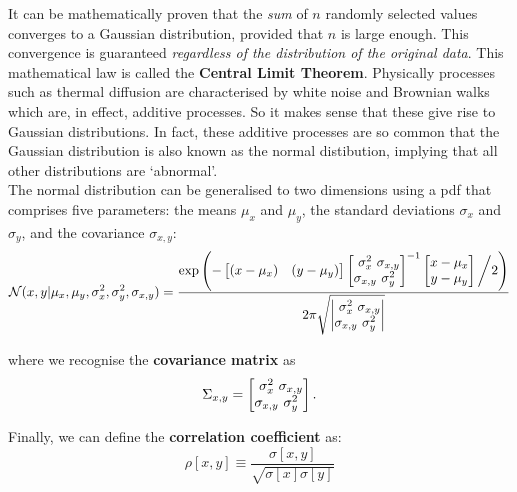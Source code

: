 \begin{refsection}
It can be mathematically proven that the \emph{sum} of $n$ randomly
selected values converges to a Gaussian distribution, provided that
$n$ is large enough. This convergence is guaranteed \textit{regardless
  of the distribution of the original data}.  This mathematical law is
called the \textbf{Central Limit Theorem}. Physically processes such
as thermal diffusion are characterised by white noise and Brownian
walks which are, in effect, additive processes.  So it makes sense
that these give rise to Gaussian distributions. In fact, these
additive processes are so common that the Gaussian distribution is
also known as the normal distibution, implying that all other
distributions are `abnormal'.\\

The normal distribution can be generalised to two dimensions using a
pdf that comprises five parameters: the means $\mu_x$ and $\mu_y$, the
standard deviations $\sigma_x$ and $\sigma_y$, and the covariance
$\sigma_{x,y}$:
\begin{equation}
\mathcal{N}(x,y|\mu_x,\mu_y,\sigma_x^2,\sigma_y^2,\sigma_{x,y}) = \frac{
\exp\left(-
\left[\begin{array}{@{}cc@{}}
(x-\mu_x) & (y-\mu_y)
\end{array}\right]
\left[\begin{array}{@{}c@{}c@{}}
\sigma^2_x & \sigma_{x,y}\\
\sigma_{x,y} & \sigma^2_y
\end{array}\right]^{-1}
\left[\begin{array}{@{}c@{}}
x-\mu_x\\
y-\mu_y
\end{array}\right] \biggl/ 2
\right)
}{2\pi\sqrt{
\left|\begin{array}{@{}c@{}c@{}}
\sigma^2_x & \sigma_{x,y}\\
\sigma_{x,y} & \sigma^2_y
\end{array}\right|
}}
\label{eq:2dgauss}
\end{equation}

\noindent where we recognise the \textbf{covariance matrix} as
\[\Sigma_{x,y} = 
\left[\begin{array}{@{}c@{}c@{}}
\sigma^2_x & \sigma_{x,y}\\
\sigma_{x,y} & \sigma^2_y
\end{array}\right].
\]

Finally, we can define the \textbf{correlation coefficient} as:
\begin{equation}
  \rho[x,y] \equiv \frac{\sigma[x,y]}{\sqrt{\sigma[x]\sigma[y]}}
  \label{eq:rho}
\end{equation}


\end{refsection}
